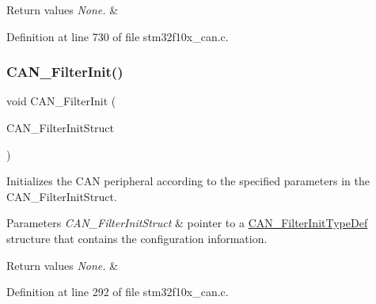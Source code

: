 \begin{DoxyRetVals}{Return values}
{\em None.} & \\
\hline
\end{DoxyRetVals}


Definition at line 730 of file stm32f10x\+\_\+can.\+c.

\mbox{\label{group___c_a_n___exported___functions_ga39476830280340363c51041be6b12647}} 
\subsubsection{\texorpdfstring{C\+A\+N\+\_\+\+Filter\+Init()}{CAN\_FilterInit()}}
{\footnotesize\ttfamily void C\+A\+N\+\_\+\+Filter\+Init (\begin{DoxyParamCaption}\item[{\hyperlink{struct_c_a_n___filter_init_type_def}{C\+A\+N\+\_\+\+Filter\+Init\+Type\+Def} $\ast$}]{C\+A\+N\+\_\+\+Filter\+Init\+Struct }\end{DoxyParamCaption})}



Initializes the C\+AN peripheral according to the specified parameters in the C\+A\+N\+\_\+\+Filter\+Init\+Struct. 


\begin{DoxyParams}{Parameters}
{\em C\+A\+N\+\_\+\+Filter\+Init\+Struct} & pointer to a \hyperlink{struct_c_a_n___filter_init_type_def}{C\+A\+N\+\_\+\+Filter\+Init\+Type\+Def} structure that contains the configuration information. \\
\hline
\end{DoxyParams}

\begin{DoxyRetVals}{Return values}
{\em None.} & \\
\hline
\end{DoxyRetVals}


Definition at line 292 of file stm32f10x\+\_\+can.\+c.

\mbox{\label{group___c_a_n___exported___functions_ga2faad96caf823ef463cc5b5b25c480bb}} 
